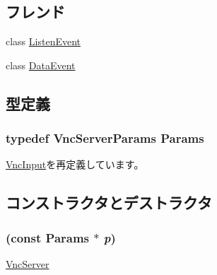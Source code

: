 \subsection*{フレンド}
\begin{DoxyCompactItemize}
\item 
class \hyperlink{classVncServer_a9465cdda0008b0e7b7f9ac919cd9cca6}{ListenEvent}
\item 
class \hyperlink{classVncServer_a8a93830b802d4fc8562fa54ead43b1f9}{DataEvent}
\end{DoxyCompactItemize}


\subsection{型定義}
\hypertarget{classVncServer_a9bc94e8c47d227e70719e2f0b14d23d8}{
\subsubsection[{Params}]{\setlength{\rightskip}{0pt plus 5cm}typedef VncServerParams {\bf Params}}}
\label{classVncServer_a9bc94e8c47d227e70719e2f0b14d23d8}


\hyperlink{classVncInput_a33249bc76b6a23eda274363d6f466b79}{VncInput}を再定義しています。

\subsection{コンストラクタとデストラクタ}
\hypertarget{classVncServer_a0438267d56345e85e9422a89bea5c886}{
\subsubsection[{VncServer}]{ (const {\bf Params} $\ast$ {\em p})}}
\label{classVncServer_a0438267d56345e85e9422a89bea5c886}
\hyperlink{classVncServer}{VncServer} 


